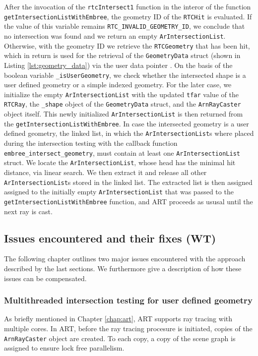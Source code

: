 After the invocation of the \texttt{rtcIntersect1} function in the interor of the function \texttt{getIntersectionListWithEmbree}, the geometry ID of the \texttt{RTCHit} is evaluated. If the value of this variable remains \texttt{RTC\_INVALID\_GEOMETRY\_ID}, we conclude that no intersection was found and we return an empty \texttt{ArIntersectionList}. Otherwise, with the geometry ID we retrieve the \texttt{RTCGeometry} that has been hit, which in return is used for the retrieval of the \texttt{GeometryData} struct (shown in Listing \ref{lst:geometry_data}) via the user data pointer . On the basis of the boolean variable \texttt{\_isUserGeometry}, we check whether the intersected shape is a user defined geometry or a simple indexed geometry. For the later case, we initialize the empty \texttt{ArIntersectionList} with the updated \texttt{tfar} value of the \texttt{RTCRay}, the \texttt{\_shape} object of the \texttt{GeometryData} struct, and the \texttt{ArnRayCaster} object itself. This newly initialized \texttt{ArIntersectionList} is then returned from the \texttt{getIntersectionListWithEmbree}.
In case the intersected geometry is a user defined geometry, the linked list, in which the \texttt{ArIntersectionList}s where placed during the intersection testing with the callback function \texttt{embree\_intersect\_geometry}, must contain at least one \texttt{ArIntersectionList} struct. We locate the \texttt{ArIntersectionList}, whose head has the minimal hit distance, via linear search. We then extract it and release all other \texttt{ArIntersectionList}s stored in the linked list. The extracted list is then assigned assigned to the initially empty \texttt{ArIntersectionList} that was passed to the \texttt{getIntersectionListWithEmbree} function, and ART proceeds as ususal until the next ray is cast.


\subsection{Issues encountered and their fixes (WT)}
The following chapter outlines two major issues encountered with the approach described by the last sections. We furthermore give a description of how these issues can be compensated.

\subsubsection{Multithreaded intersection testing for user defined geometry}
As briefly mentioned in Chapter \ref{chap:art}, ART supports ray tracing with multiple cores.
In ART, before the ray tracing procesure is initiated, copies of the \texttt{ArnRayCaster} object are created. To each copy, a copy of the scene graph is assigned to ensure lock free parallelism.

